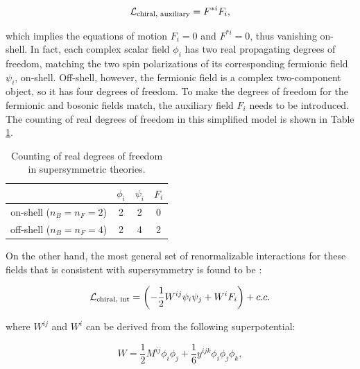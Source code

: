 \begin{equation}
\mathcal{L}_\text{chiral, auxiliary} = F^{\ast i} F_i,
\label{eq:SUSYChiralAuxiliaryLagrangian}
\end{equation}

\noindent which implies the equations of motion $F_i=0$ and $F^{\ast i}=0$, thus vanishing on-shell.
In fact, each complex scalar field $\phi_i$ has two real propagating degrees of freedom, matching the two spin polarizations of its corresponding fermionic field $\psi_i$, on-shell.
Off-shell, however, the fermionic field is a complex two-component object, so it has four degrees of freedom.
To make the degrees of freedom for the fermionic and bosonic fields match, the auxiliary field $F_i$ needs to be introduced.
The counting of real degrees of freedom in this simplified model is shown in Table \ref{tab:SUSYChiralCountingDOF}.

\begin{table}[!ht]
\begin{center}
\begin{small}
\begin{tabular}{cccc}
\hline
\hline
& $\phi_i$ & $\psi_i$ & $F_i$ \\
\hline
on-shell ($n_B = n_F = 2$)  & 2      & 2      & 0 \\
off-shell ($n_B = n_F = 4$) & 2      & 4      & 2 \\
\hline
\hline
\end{tabular}
\end{small}
\end{center}
\caption{Counting of real degrees of freedom in supersymmetric theories.}
\label{tab:SUSYChiralCountingDOF}
\end{table}

On the other hand, the most general set of renormalizable interactions for these fields that is consistent with supersymmetry is found to be \cite{Martin:1997ns}:

\begin{equation}
\lagrangian_{\text{chiral, int}} = \left( -\frac{1}{2} W^{ij}\psi_i \psi_j + W^i F_i\right) + c.c.
\label{eq:SUSYChiralInteractionLagrangian}
\end{equation}

\noindent where $W^{ij}$ and $W^i$ can be derived from the following superpotential:

\begin{equation}
W = \frac{1}{2} M^{ij} \phi_i \phi_j + \frac{1}{6} y^{ijk} \phi_i \phi_j \phi_k ,
\label{eq:SUSYChiralSuperpotential}
\end{equation}

